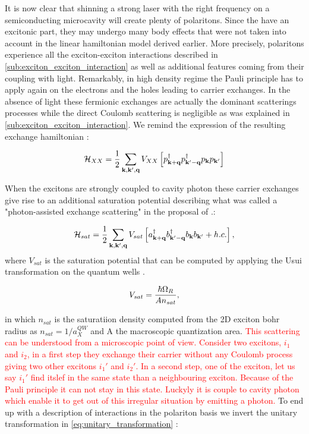 It is now clear that shinning a strong laser with the right frequency on a semiconducting microcavity will create plenty of polaritons. Since the have an excitonic part,
they may undergo many body effects that were not taken into account in the linear hamiltonian model derived earlier. More precisely, polaritons experience 
all the exciton-exciton interactions described in \autoref{sub:exciton_exciton_interaction} as well as additional features coming from their coupling with light.
Remarkably, in high density regime the Pauli principle has to apply again on the electrons and the holes leading to carrier exchanges. In the absence of light
these fermionic exchanges are actually the dominant scatterings processes while the direct Coulomb scattering is negligible as was explained in \autoref{sub:exciton_exciton_interaction}.
We remind the expression of the resulting exchange hamiltonian :

\begin{equation}
    \mathcal{H}_{XX} = \dfrac{1}{2}\sum_{\mathbf{k}, \mathbf{k}', \mathbf{q}}V_{XX}\left[p^{\dagger}_{\mathbf{k+q}}p^{\dagger}_{\mathbf{k'-q}}p_{\mathbf{k}}p_{\mathbf{k'}}\right]
    \label{eq:direct_pol_interaction}
\end{equation}

When the excitons are strongly coupled to cavity photon these carrier exchanges give rise to an additional saturation potential describing what was called a "photon-assisted exchange scattering" in the proposal of \cite{Combescot_2007_exact_pol_pol_interactions}.:


\begin{equation}
    \mathcal{H}_{sat} = \dfrac{1}{2} \sum_{\mathbf{k}, \mathbf{k}', \mathbf{q}} V_{sat} \left[ a^\dagger_{\mathbf{k}+ \mathbf{q}} b^\dagger_{\mathbf{k}'- \mathbf{q}} b_{\mathbf{k}} b_{\mathbf{k}'} + h.c. \right],
\end{equation}
where $V_{sat}$ is the saturation potential that can be computed by applying the Usui transformation on the quantum wells \cite{usui_sat_potential_1960}.

\begin{equation}
    V_{sat}=\dfrac{\hbar\Omega_R}{An_{sat}},
\end{equation}

in which $n_{sat}$ is the saturatiion density computed from the 2D exciton bohr radius as $n_{sat}=1/a_X^{QW}$ and A the macroscopic quantization area.
\textcolor{red}{This scattering can be understood from a microscopic point of view. Consider two excitons, $i_1$ and $i_2$, in a first step they exchange their carrier without any Coulomb process giving
two other excitons $i_1'$ and $i_2'$. In a second step, one of the exciton, let us say $i_1'$ find itslef in the same state than a neighbouring exciton. Because of the Pauli principle it can not stay in this state. Luckyly it is couple 
to cavity photon which enable it to get out of this irregular situation by emitting a photon.}
To end up with a description of interactions in the polariton basis we invert the unitary transformation in \autoref{eq:unitary_transformation} : 

